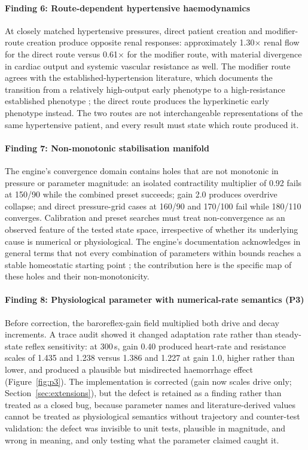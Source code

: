 \documentclass[preprint,12pt,nopreprintline]{elsarticle}
\begin{document}
\paragraph{Finding 6: Route-dependent hypertensive haemodynamics} At closely matched hypertensive pressures, direct patient creation and modifier-route creation produce opposite renal responses: approximately 1.30$\times$ renal flow for the direct route versus 0.61$\times$ for the modifier route, with material divergence in cardiac output and systemic vascular resistance as well. The modifier route agrees with the established-hypertension literature, which documents the transition from a relatively high-output early phenotype to a high-resistance established phenotype \cite{lundjohansen1991}; the direct route produces the hyperkinetic early phenotype instead. The two routes are not interchangeable representations of the same hypertensive patient, and every result must state which route produced it.

\paragraph{Finding 7: Non-monotonic stabilisation manifold} The engine's convergence domain contains holes that are not monotonic in pressure or parameter magnitude: an isolated contractility multiplier of 0.92 fails at 150/90 while the combined preset succeeds; gain 2.0 produces overdrive collapse; and direct pressure-grid cases at 160/90 and 170/100 fail while 180/110 converges. Calibration and preset searches must treat non-convergence as an observed feature of the tested state space, irrespective of whether its underlying cause is numerical or physiological. The engine's documentation acknowledges in general terms that not every combination of parameters within bounds reaches a stable homeostatic starting point \cite{pulsepatient}; the contribution here is the specific map of these holes and their non-monotonicity.

\paragraph{Finding 8: Physiological parameter with numerical-rate semantics (P3)} Before correction, the baroreflex-gain field multiplied both drive and decay increments. A trace audit showed it changed adaptation rate rather than steady-state reflex sensitivity: at 300\,s, gain 0.40 produced heart-rate and resistance scales of 1.435 and 1.238 versus 1.386 and 1.227 at gain 1.0, higher rather than lower, and produced a plausible but misdirected haemorrhage effect (Figure~\ref{fig:p3}). The implementation is corrected (gain now scales drive only; Section~\ref{sec:extensions}), but the defect is retained as a finding rather than treated as a closed bug, because parameter names and literature-derived values cannot be treated as physiological semantics without trajectory and counter-test validation: the defect was invisible to unit tests, plausible in magnitude, and wrong in meaning, and only testing what the parameter claimed caught it.
\end{document}
